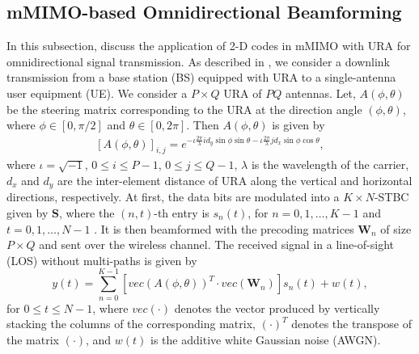 \documentclass[pdflatex,sn-mathphys-num]{sn-jnl}%
\theoremstyle{thmstyleone}
\begin{document}
	
	
	\subsection{mMIMO-based Omnidirectional Beamforming}
	In this subsection, discuss the application of 2-D codes in mMIMO with URA for omnidirectional signal transmission.  As described in \cite{Omni1, Omni2}, we consider a downlink transmission from a base station (BS) equipped with URA to a single-antenna user equipment (UE).  We consider a $P \times Q$ URA of $PQ$ antennas. Let, $A( \phi, \theta)$ be the steering matrix corresponding to the URA at the direction angle $(\phi, \theta)$, where $\phi \in [0, \pi/2]$ and $\theta \in [0, 2 \pi]$. Then $A(\phi, \theta)$ is given by
	\begin{equation}\label{steering}
		\begin{split}
			[A(\phi, \theta)]_{i,j}= e^{-\iota \frac{2 \pi}{\lambda} i d_y \sin \phi \sin \theta - \iota \frac{2 \pi}{\lambda} j d_x \sin \phi \cos \theta},
		\end{split}
	\end{equation}
	where $\iota= \sqrt{-1}$, $0 \leq i \leq P-1$, $0 \leq j \leq Q-1$,  $\lambda$ is the wavelength of the carrier, $d_x$ and $d_y$ are the inter-element distance of URA along the vertical and horizontal directions, respectively. At first, the data bits are modulated into a $K \times N$-STBC given by $\mathbf{S}$, where the $(n,t)$-th entry is $s_n(t)$, for $n=0,1,\dots, K-1$ and $t=0,1,\dots, N-1$ \cite{STBC}. It is then beamformed with the precoding matrices $\mathbf{W}_n$ of size $P \times Q$ and sent over the wireless channel. The received signal in a line-of-sight (LOS) without multi-paths is given by
	\begin{equation}\label{received_signal}
		y(t)= \sum_{n=0}^{K-1} \left[vec(A(\phi, \theta))^T \cdot vec(\mathbf{W}_n)\right] s_n(t) + w(t),
	\end{equation}
	for $0 \leq t \leq N-1$,
	where $vec(\cdot)$ denotes the vector produced by vertically stacking the columns of the corresponding matrix,  $(\cdot)^T$ denotes the transpose of the matrix $(\cdot)$, and $w(t)$ is the additive white Gaussian noise (AWGN). 
	
\end{document}

